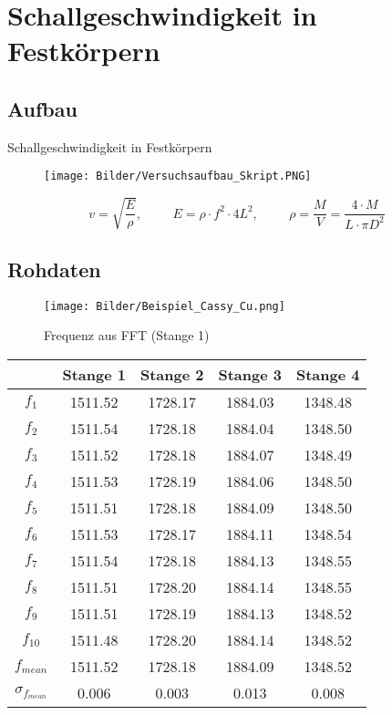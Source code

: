 \documentclass[11pt]{beamer}
\begin{document}
\section{Schallgeschwindigkeit in Festkörpern}
\subsection{Aufbau}
\begin{frame}{Schallgeschwindigkeit in Festkörpern}
\begin{figure}[H]
\centering
\texttt{[image: Bilder/Versuchsaufbau\_Skript.PNG]}
\label{Stange}
\end{figure}
\begin{equation*}
v=\sqrt{\frac{E}{\rho}}, \hspace{1cm} E= \rho\cdot f^2\cdot 4L^2, \hspace{1cm} \rho=\frac{M}{V}=\frac{4\cdot M}{L\cdot \pi D^2}
\end{equation*}
\end{frame}
\subsection{Rohdaten}
\begin{frame}
\begin{figure}[H]
\centering
\texttt{[image: Bilder/Beispiel\_Cassy\_Cu.png]}
\caption{Frequenz aus FFT (Stange 1)}
\end{figure}
\end{frame}

\begin{frame}
\begin{table}[H]\centering
\begin{tabular}{c|cccc}
 & Stange 1 & Stange 2 & Stange 3 & Stange 4 \\ 
 \hline
$f_1$ & 1511.52 & 1728.17 & 1884.03 & 1348.48 \\ 
$f_2$ & 1511.54 & 1728.18 & 1884.04 & 1348.50 \\ 
$f_3$ & 1511.52 & 1728.18 & 1884.07 & 1348.49 \\ 
$f_4$ & 1511.53 & 1728.19 & 1884.06 & 1348.50 \\ 
$f_5$ & 1511.51 & 1728.18 & 1884.09 & 1348.50 \\ 
$f_6$ & 1511.53 & 1728.17 & 1884.11 & 1348.54 \\ 
$f_7$ & 1511.54 & 1728.18 & 1884.13 & 1348.55 \\ 
$f_8$ & 1511.51 & 1728.20 & 1884.14 & 1348.55 \\ 
$f_9$ & 1511.51 & 1728.19 & 1884.13 & 1348.52 \\ 
$f_{10}$ & 1511.48 & 1728.20 & 1884.14 & 1348.52 \\
\hline 
$f_{mean}$ & 1511.52 & 1728.18 &  1884.09 & 1348.52 \\ 
$\sigma_{f_{mean}}$ & 0.006 & 0.003 & 0.013 & 0.008 \\ 
\end{tabular}
\end{table}
\end{frame}
\end{document}

